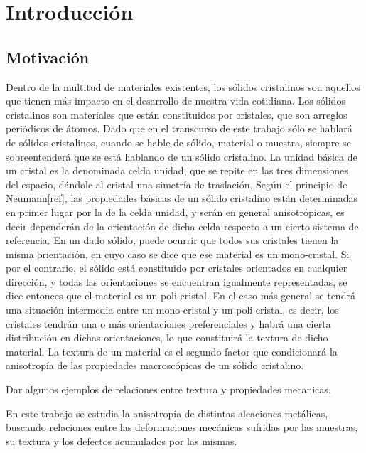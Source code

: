 \chapter{Introducción}
\graphicspath{{./figs/01_intro/}}
\section{Motivación}\label{S:motivacion}
Dentro de la multitud de materiales existentes, los sólidos cristalinos son aquellos que tienen más impacto en el desarrollo de nuestra vida cotidiana. 
Los sólidos cristalinos son materiales que están constituidos por cristales, que son arreglos periódicos de átomos. 
Dado que en el transcurso de este trabajo sólo se hablará de sólidos cristalinos, cuando se hable de sólido, material o muestra, siempre se sobreentenderá que se está hablando de un sólido cristalino. 
La unidad básica de un cristal es la denominada celda unidad, que se repite en las tres dimensiones del espacio, dándole al cristal una simetría de traslación. 
Según el principio de Neumann[ref], las propiedades básicas de un sólido cristalino están determinadas en primer lugar por la de la celda unidad, y serán en general anisotrópicas, es decir dependerán de la orientación de dicha celda respecto a un cierto sistema de referencia.
En un dado sólido, puede ocurrir que todos sus cristales tienen la misma orientación, en cuyo caso se dice que ese material es un mono-cristal. Si por el contrario, el sólido está constituido por cristales orientados en cualquier dirección, y todas las orientaciones se encuentran igualmente representadas, se dice entonces que el material es un poli-cristal. 
En el caso más general se tendrá una situación intermedia entre un mono-cristal y un poli-cristal, es decir, los cristales tendrán una o más orientaciones preferenciales y habrá una cierta distribución en dichas orientaciones, lo que constituirá la textura de dicho material. La textura de un material es el segundo factor que condicionará la anisotropía de las propiedades macroscópicas de un sólido cristalino.

Dar algunos ejemplos de relaciones entre textura y propiedades mecanicas.

En este trabajo se estudia la anisotropía de distintas aleaciones metálicas, buscando relaciones entre las deformaciones mecánicas sufridas por las muestras, su textura y los defectos acumulados por las mismas.

